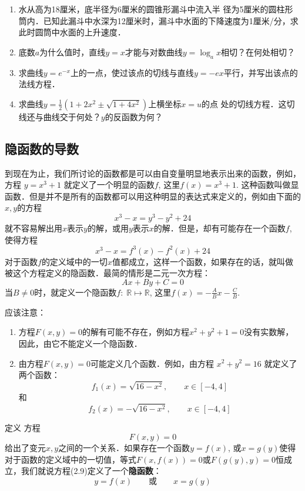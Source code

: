 \begin{ex}
\begin{enumerate}
\item 水从高为18厘米，底半径为6厘米的圆锥形漏斗中流入半
径为5厘米的圆柱形筒内．已知此漏斗中水深为12厘米时，漏斗中水面的下降速度为1厘米/分，求此时圆筒中水面的上升速度．
\item 底数$a$为什么值时，直线$y=x$才能与对数曲线$y=\log_a x$相切？在何处相切？
\item 求曲线$y=e^{-x}$上的一点，使过该点的切线与直线$y=-ex$平行，并写出该点的法线方程．
\item 求曲线$y=\frac{1}{2}(1+2x^2\pm \sqrt{1+4x^2})$上横坐标$x=u$的点
处的切线方程．这切线还与曲线交于何处？$y$的反函数为何？
\end{enumerate}    
\end{ex}

\subsection{隐函数的导数}

到现在为止，我们所讨论的函数都是可以由自变量明显地表示出来的函数，例如，方程
$y=x^3+1$
就定义了一个明显的函数$f$, 这里$f(x)=x^3+1$. 这种函数叫做显函数．但是并不是所有的函数都可以用这种明显的表达式来定义的，例如由下面的$x,y$的方程
\[x^3-x=y^3-y^2+24\]
就不容易解出用$x$表示$y$的解，或用$y$表示$x$的解．但是，却有可能存在一个函数$f$, 使得方程
\[x^3-x=f^3(x)-f^2(x)+24\]
对于函数$f$的定义域中的一切$x$值都成立，这样一个函数，如果存在的话，就叫做被这个方程定义的隐函数．最简的情形是二元一次方程：
\[Ax+By+C=0\]
当$B\ne 0$时，就定义一个隐函数$f:\; \mathbb{R}\mapsto \mathbb{R}$, 这里$f(x)=-\frac{A}{B}x-\frac{C}{B}$. 

应该注意：
\begin{enumerate}
\item 方程$F(x,y)=0$的解有可能不存在，例如方程$x^2+y^2+1=0$没有实数解，因此，由它不能定义一个隐函数．
\item 由方程$F(x,y)=0$可能定义几个函数．例如，由方程
$x^2+y^2=16$
就定义了两个函数：
\[f_1 (x) =\sqrt{16-x^2},\qquad x\in [-4, 4] \]
和
\[f_2 (x) =-\sqrt{16-x^2},\qquad x\in  [-4, 4] \]
\end{enumerate}

\begin{blk}
    {定义} 方程
    \begin{equation}
 F (x,y) =0       
    \end{equation}
给出了变元$x,y$之间的一个关系．如果存在一个函数$y=
f(x)$, 或$x=g(y)$使得对于函数的定义域中的一切值，等式$F(x,f(x))=0$或$F(g(y),y)=0$恒成立，我们就说方程(2.9)定义了一个\textbf{隐函数}：
\[y=f(x)\qquad \text{或}\qquad x=g(y)\]
\end{blk}

